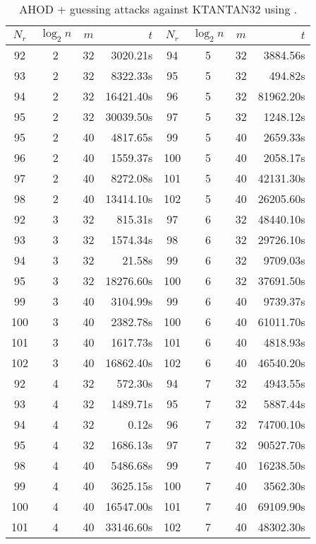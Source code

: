 \begin{table}[htbp]
\begin{center}
\begin{tabular}{|c|c|c|r||c|c|c|r|}
\hline
$N_r$ & $\log_2 n$ & $m$ & $t$ & $N_r$ & $\log_2 n$ & $m$ & $t$ \\
\hline
 92 & 2 & 32 &  3020.21s  &  94 & 5 & 32 &  3884.56s \\
 93 & 2 & 32 &  8322.33s  &  95 & 5 & 32 &   494.82s \\
 94 & 2 & 32 & 16421.40s  &  96 & 5 & 32 & 81962.20s \\
 95 & 2 & 32 & 30039.50s  &  97 & 5 & 32 &  1248.12s \\
\hline                      \hline                        
 95 & 2 & 40 &  4817.65s  &  99 & 5 & 40 &  2659.33s \\
 96 & 2 & 40 &  1559.37s  & 100 & 5 & 40 &  2058.17s \\
 97 & 2 & 40 &  8272.08s  & 101 & 5 & 40 & 42131.30s \\
 98 & 2 & 40 & 13414.10s  & 102 & 5 & 40 & 26205.60s \\ 
\hline                      \hline               
 92 & 3 & 32 &   815.31s  &  97 & 6 & 32 & 48440.10s \\ 
 93 & 3 & 32 &  1574.34s  &  98 & 6 & 32 & 29726.10s \\ 
 94 & 3 & 32 &    21.58s  &  99 & 6 & 32 &  9709.03s \\ 
 95 & 3 & 32 & 18276.60s  & 100 & 6 & 32 & 37691.50s \\ 
\hline                      \hline               
 99 & 3 & 40 &  3104.99s  &  99 & 6 & 40 &  9739.37s \\ 
100 & 3 & 40 &  2382.78s  & 100 & 6 & 40 & 61011.70s \\ 
101 & 3 & 40 &  1617.73s  & 101 & 6 & 40 &  4818.93s \\ 
102 & 3 & 40 & 16862.40s  & 102 & 6 & 40 & 46540.20s \\ 
\hline                      \hline               
 92 & 4 & 32 &   572.30s  &  94 & 7 & 32 &  4943.55s \\ 
 93 & 4 & 32 &  1489.71s  &  95 & 7 & 32 &  5887.44s \\ 
 94 & 4 & 32 &     0.12s  &  96 & 7 & 32 & 74700.10s \\ 
 95 & 4 & 32 &  1686.13s  &  97 & 7 & 32 & 90527.70s \\ 
\hline                      \hline               
 98 & 4 & 40 &  5486.68s  &  99 & 7 & 40 & 16238.50s \\ 
 99 & 4 & 40 &  3625.15s  & 100 & 7 & 40 &  3562.30s \\ 
100 & 4 & 40 & 16547.00s  & 101 & 7 & 40 & 69109.90s \\ 
101 & 4 & 40 & 33146.60s  & 102 & 7 & 40 & 48302.30s \\ 
\hline
\end{tabular}
\end{center}
\caption{AHOD + guessing attacks against KTANTAN32 using \MiniSat.}
\label{tab:ahod-ktantan32-minisat-guess}
\end{table}


